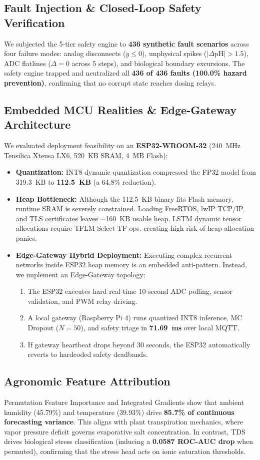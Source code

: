 \documentclass[conference]{IEEEtran}
\begin{document}
\subsection{Fault Injection \& Closed-Loop Safety Verification}
We subjected the 5-tier safety engine to \textbf{436 synthetic fault scenarios} across four failure modes: analog disconnects ($y \le 0$), unphysical spikes ($|\Delta \mathrm{pH}| > 1.5$), ADC flatlines ($\Delta = 0$ across 5 steps), and biological boundary excursions. The safety engine trapped and neutralized all \textbf{436 of 436 faults (100.0\% hazard prevention)}, confirming that no corrupt state reaches dosing relays.

\subsection{Embedded MCU Realities \& Edge-Gateway Architecture}
We evaluated deployment feasibility on an \textbf{ESP32-WROOM-32} (240~MHz Tensilica Xtensa LX6, 520~KB SRAM, 4~MB Flash):
\begin{itemize}
    \item \textbf{Quantization:} INT8 dynamic quantization compressed the FP32 model from 319.3~KB to \textbf{112.5~KB} (a 64.8\% reduction).
    \item \textbf{Heap Bottleneck:} Although the 112.5~KB binary fits Flash memory, runtime SRAM is severely constrained. Loading FreeRTOS, lwIP TCP/IP, and TLS certificates leaves $\sim$160~KB usable heap. LSTM dynamic tensor allocations require TFLM Select TF ops, creating high risk of heap allocation panics.
    \item \textbf{Edge-Gateway Hybrid Deployment:} Executing complex recurrent networks inside ESP32 heap memory is an embedded anti-pattern. Instead, we implement an Edge-Gateway topology:
    \begin{enumerate}
        \item The ESP32 executes hard real-time 10-second ADC polling, sensor validation, and PWM relay driving.
        \item A local gateway (Raspberry Pi 4) runs quantized INT8 inference, MC Dropout ($N=50$), and safety triage in \textbf{71.69~ms} over local MQTT.
        \item If gateway heartbeat drops beyond 30 seconds, the ESP32 automatically reverts to hardcoded safety deadbands.
    \end{enumerate}
\end{itemize}

\subsection{Agronomic Feature Attribution}
Permutation Feature Importance and Integrated Gradients show that ambient humidity (45.79\%) and temperature (39.93\%) drive \textbf{85.7\% of continuous forecasting variance}. This aligns with plant transpiration mechanics, where vapor pressure deficit governs evaporative salt concentration. In contrast, TDS drives biological stress classification (inducing a \textbf{0.0587 ROC-AUC drop} when permuted), confirming that the stress head acts on ionic saturation thresholds.
\end{document}
